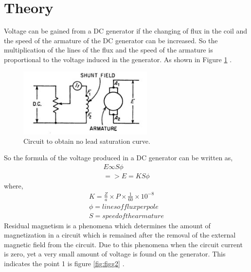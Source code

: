\section{Theory}
Voltage can be gained from a DC generator if the changing of flux in the coil and the speed of the armature of the DC generator can be increased. So the multiplication of the lines of the flux and the speed of the armature is proportional to the voltage induced in the generator. As shown in Figure \ref{fig:figg1} .
\FloatBarrier
\begin{figure}[hbt!]
\vspace{00mm}
    \centerline{\includegraphics[width=0.6\textwidth]{Figures/Exp02/machine Lab 2 .jpeg}}
    \vspace{0mm}
    \caption{Circuit to obtain no lead saturation curve.}
    \label{fig:figg1}
\end{figure}
\newpage
So the formula of the voltage produced in a DC generator can be written as,
\begin{align}
\nonumber
E \infty S\phi
\\
=> E = KS\phi
\end{align}
where,
\begin{align}
    \nonumber
    K=\frac{Z}{a}\times P\times \frac{1}{60}\times10^{-8}
    \\\nonumber
    \phi = lines of flux per pole 
    \\\nonumber
    S = speed of the armature
\end{align}
Residual magnetism is a phenomena which determines the amount of magnetization in a circuit which is remained after the removal of the external magnetic field from the circuit. Due to this phenomena when the circuit current is zero, yet a very small amount of voltage is found on the generator. This indicates the point 1 is figure \ref{fig:figg2} . 

